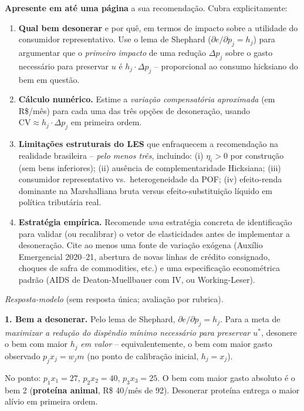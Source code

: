 \documentclass[11pt,addpoints]{exam}
\begin{document}
\begin{spacing}{1.3}
\begin{questions}
\textbf{Apresente em até uma página} a sua recomendação. Cubra explicitamente:
\begin{enumerate}[noitemsep]
\item \textbf{Qual bem desonerar} e por quê, em termos de impacto sobre a utilidade do consumidor representativo. Use o lema de Shephard ($\partial e/\partial p_j = h_j$) para argumentar que o \emph{primeiro impacto} de uma redução $\Delta p_j$ sobre o gasto necessário para preservar $u$ é $h_j\cdot \Delta p_j$ -- proporcional ao consumo hicksiano do bem em questão.
\item \textbf{Cálculo numérico.} Estime a \emph{variação compensatória aproximada} (em R\$/mês) para cada uma das três opções de desoneração, usando $\mathrm{CV} \approx h_j\cdot \Delta p_j$ em primeira ordem.
\item \textbf{Limitações estruturais do LES} que enfraquecem a recomendação na realidade brasileira -- \emph{pelo menos três}, incluindo: (i) $\eta_i > 0$ por construção (sem bens inferiores); (ii) ausência de complementaridade Hicksiana; (iii) consumidor representativo vs.\ heterogeneidade da POF; (iv) efeito-renda dominante na Marshalliana bruta versus efeito-substituição líquido em política tributária real.
\item \textbf{Estratégia empírica.} Recomende \emph{uma} estratégia concreta de identificação para validar (ou recalibrar) o vetor de elasticidades antes de implementar a desoneração. Cite ao menos uma fonte de variação exógena (Auxílio Emergencial 2020--21, abertura de novas linhas de crédito consignado, choques de safra de commodities, etc.) e uma especificação econométrica padrão (AIDS de Deaton-Muellbauer com IV, ou Working-Leser).
\end{enumerate}

\begin{solution}
\textit{Resposta-modelo} (sem resposta única; avaliação por rubrica).

\textbf{1. Bem a desonerar.} Pelo lema de Shephard, $\partial e/\partial p_j = h_j$. Para a meta de \emph{maximizar a redução do dispêndio mínimo necessário para preservar $u^*$}, desonere o bem com maior $h_j$ \emph{em valor} -- equivalentemente, o bem com maior gasto observado $p_j x_j = w_j m$ (no ponto de calibração inicial, $h_j = x_j$).

No ponto: $p_1 x_1 = 27$, $p_2 x_2 = 40$, $p_3 x_3 = 25$. O bem com maior gasto absoluto é o bem 2 (\textbf{proteína animal}, R\$ 40/mês de 92). Desonerar proteína entrega o maior alívio em primeira ordem.


\end{solution}
\end{questions}
\end{spacing}
\end{document}
